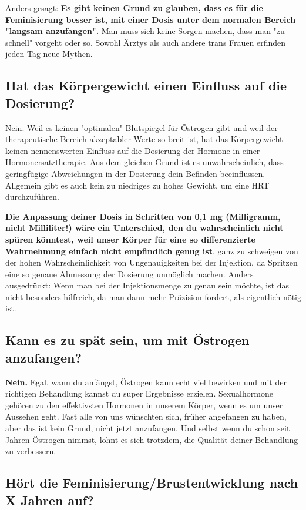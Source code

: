 \documentclass{article}
\begin{document}
Anders gesagt: \textbf{Es gibt keinen Grund zu glauben, dass es für die Feminisierung besser ist, mit einer Dosis unter dem normalen Bereich "langsam anzufangen".} Man muss sich keine Sorgen machen, dass man "zu schnell" vorgeht oder so. Sowohl Ärztys als auch andere trans Frauen erfinden jeden Tag neue Mythen.

\subsection{Hat das Körpergewicht einen Einfluss auf die Dosierung?}

Nein. Weil es keinen "optimalen" Blutspiegel für Östrogen gibt und weil der therapeutische Bereich akzeptabler Werte so breit ist, hat das Körpergewicht keinen nennenswerten Einfluss auf die Dosierung der Hormone in einer Hormonersatztherapie. Aus dem gleichen Grund ist es unwahrscheinlich, dass geringfügige Abweichungen in der Dosierung dein Befinden beeinflussen. Allgemein gibt es auch kein zu niedriges zu hohes Gewicht, um eine HRT durchzuführen.

\textbf{Die Anpassung deiner Dosis in Schritten von 0,1 mg (Milligramm, nicht Milliliter!) wäre ein Unterschied, den du wahrscheinlich nicht spüren könntest, weil unser Körper für eine so differenzierte Wahrnehmung einfach nicht empfindlich genug ist}, ganz zu schweigen von der hohen Wahrscheinlichkeit von Ungenauigkeiten bei der Injektion, da Spritzen eine so genaue Abmessung der Dosierung unmöglich machen. Anders ausgedrückt: Wenn man bei der Injektionsmenge zu genau sein möchte, ist das nicht besonders hilfreich, da man dann mehr Präzision fordert, als eigentlich nötig ist.

\subsection{Kann es zu spät sein, um mit Östrogen anzufangen?}\label{11-5}

\textbf{Nein.} Egal, wann du anfängst, Östrogen kann echt viel bewirken und mit der richtigen Behandlung kannst du super Ergebnisse erzielen. Sexualhormone gehören zu den effektivsten Hormonen in unserem Körper, wenn es um unser Aussehen geht. Fast alle von uns wünschten sich, früher angefangen zu haben, aber das ist kein Grund, nicht jetzt anzufangen. Und selbst wenn du schon seit Jahren Östrogen nimmst, lohnt es sich trotzdem, die Qualität deiner Behandlung zu verbessern.

\subsection{Hört die Feminisierung/Brustentwicklung nach X Jahren auf?}\label{11-6}
\end{document}
